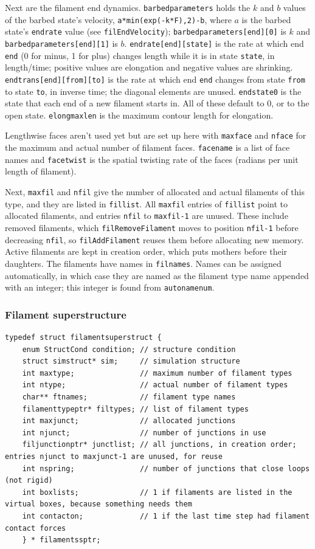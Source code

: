 \documentclass {scrbook}
\newcommand {\ttt} {\texttt}
\begin{document}
Next are the filament end dynamics. \ttt{barbedparameters} holds the $k$ and $b$ values of the barbed state's velocity, \ttt{a*min(exp(-k*F),2)-b}, where $a$ is the barbed state's \ttt{endrate} value (see \ttt{filEndVelocity}); \ttt{barbedparameters[end][0]} is $k$ and \ttt{barbedparameters[end][1]} is $b$. \ttt{endrate[end][state]} is the rate at which end \ttt{end} (0 for minus, 1 for plus) changes length while it is in state \ttt{state}, in length/time; positive values are elongation and negative values are shrinking. \ttt{endtrans[end][from][to]} is the rate at which end \ttt{end} changes from state \ttt{from} to state \ttt{to}, in inverse time; the diagonal elements are unused. \ttt{endstate0} is the state that each end of a new filament starts in. All of these default to 0, or to the open state. \ttt{elongmaxlen} is the maximum contour length for elongation.

Lengthwise faces aren't used yet but are set up here with \ttt{maxface} and \ttt{nface} for the maximum and actual number of filament faces. \ttt{facename} is a list of face names and \ttt{facetwist} is the spatial twisting rate of the faces (radians per unit length of filament).

Next, \ttt{maxfil} and \ttt{nfil} give the number of allocated and actual filaments of this type, and they are listed in \ttt{fillist}. All \ttt{maxfil} entries of \ttt{fillist} point to allocated filaments, and entries \ttt{nfil} to \ttt{maxfil-1} are unused. These include removed filaments, which \ttt{filRemoveFilament} moves to position \ttt{nfil-1} before decreasing \ttt{nfil}, so \ttt{filAddFilament} reuses them before allocating new memory. Active filaments are kept in creation order, which puts mothers before their daughters. The filaments have names in \ttt{filnames}. Names can be assigned automatically, in which case they are named as the filament type name appended with an integer; this integer is found from \ttt{autonamenum}.\\

\subsubsection{Filament superstructure}

\begin{lstlisting}
typedef struct filamentsuperstruct {
    enum StructCond condition; // structure condition
    struct simstruct* sim;     // simulation structure
    int maxtype;               // maximum number of filament types
    int ntype;                 // actual number of filament types
    char** ftnames;            // filament type names
    filamenttypeptr* filtypes; // list of filament types
    int maxjunct;              // allocated junctions
    int njunct;                // number of junctions in use
    filjunctionptr* junctlist; // all junctions, in creation order; entries njunct to maxjunct-1 are unused, for reuse
    int nspring;               // number of junctions that close loops (not rigid)
    int boxlists;              // 1 if filaments are listed in the virtual boxes, because something needs them
    int contacton;             // 1 if the last time step had filament contact forces
    } * filamentssptr;
\end{lstlisting}
\end{document}
